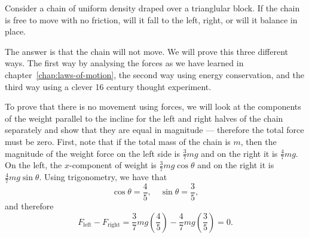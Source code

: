 \documentclass[../classical_mechanics.tex]{subfiles}
\begin{document}
            \begin{example}
                Consider a chain of uniform density draped over a trianglular block.
                If the chain is free to move with no friction, will it fall to the left, right, or will it balance in place.

                The answer is that the chain will not move.
                We will prove this three different ways.
                The first way by analysing the forces as we have learned in chapter~\ref{chap:laws-of-motion}, the second way using energy conservation, and the third way using a clever 16 century thought experiment.

                To prove that there is no movement using forces, we will look at the components of the weight parallel to the incline for the left and right halves of the chain separately and show that they are equal in magnitude --- therefore the total force must be zero.
                First, note that if the total mass of the chain is $m$, then the magnitude of the weight force on the left side is $\frac{3}{7}mg$ and on the right it is $\frac{4}{7}mg$.
                On the left, the $x$-component of weight is $\frac{3}{7}mg\cos\theta$ and on the right it is $\frac{4}{7}mg\sin\theta$.
                Using trigonometry, we have that
                \begin{equation}
                    \cos\theta=\frac{4}{5},\quad\sin\theta=\frac{3}{5},
                \end{equation}
                and therefore
                \begin{equation}
                    F_\text{left}-F_\text{right}=\frac{3}{7}mg(\frac{4}{5})-\frac{4}{7}mg(\frac{3}{5})=0.
                \end{equation}


\end{example}
\end{document}

